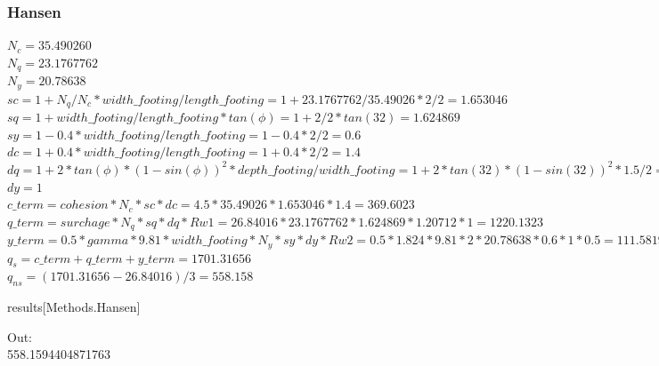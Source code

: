 \subsubsection{Hansen}
$N_c=35.490260$\\
$N_q=23.1767762$\\
$N_y=20.78638$\\
$sc=1+N_q/N_c*width\_footing/length\_footing= 1+23.1767762/35.49026*2/2=1.653046$\\
$sq=1+width\_footing/length\_footing*tan(\phi)=1+2/2*tan(32)=1.624869$\\
$sy=1-0.4*width\_footing/length\_footing=1-0.4*2/2=0.6$\\
$dc = 1 +0.4*width\_footing/length\_footing=1+0.4*2/2=1.4$\\
$dq = 1 +2*tan(\phi)*(1-sin(\phi))^2 * depth\_footing/width\_footing=1+2*tan(32)*(1-sin(32))^2*1.5/2=1.20712$\\
$dy=1$\\
$c\_term = cohesion*N_c*sc*dc=4.5*35.49026*1.653046*1.4=369.6023$\\
$q\_term = surchage*N_q*sq*dq*Rw1=26.84016*23.1767762*1.624869*1.20712*1=1220.1323$\\
$y\_term = 0.5*gamma*9.81*width\_footing*N_y*sy*dy*Rw2=0.5*1.824*9.81*2*20.78638*0.6*1*0.5=111.581953$\\
$q_s = c\_term+q\_term+y\_term=1701.31656$\\
$q_{ns} = (1701.31656 - 26.84016)/3 = 558.158$
\begin{python}
results[Methods.Hansen]
\end{python}
Out:\\
558.1594404871763

